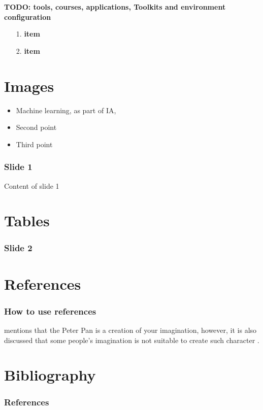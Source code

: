 \documentclass[english,svgnames,notes=hide,12pt]{beamer}
\begin{document}
\begin{frame}
    \textbf{TODO: tools, courses, applications, Toolkits and environment configuration}
    \begin{itemize}
        \item[\small{1.}] \textbf{item} 
        \item[\small{2.}] \textbf{item}
    \end{itemize}

\end{frame}


\section{Images}
\begin{frame}
\begin{itemize}[<+->]

    \item Machine learning, as part of IA,
    \item Second point
    \item Third point
\end{itemize}
	\frametitle{Slide 1}
	Content of slide 1
\end{frame}

\section{Tables}
\begin{frame}
	\frametitle{Slide 2}
\end{frame}

\section{References}
\begin{frame}
    \frametitle{How to use references}
     mentions that the Peter Pan is a creation of your imagination, however, it is also discussed that some people's imagination is not suitable to create such character .
\end{frame}

\section*{Bibliography}
\begin{frame}[allowframebreaks]
    \frametitle{References}
    \fontsize{5pt}{6.2}\selectfont
    
    \renewcommand{\bibliographytypesize}{\small}
    
\end{frame}
\end{document}
